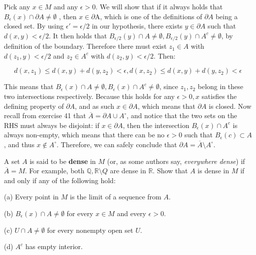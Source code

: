 \begin{solution}

    Pick any $x \in M$ and any $\epsilon > 0$.
    We will show that if it always holds that $B_{\epsilon}(x) \cap \partial A \neq \emptyset$ , then $x \in \partial $A, which is one of the definitions of $\partial A$ being a closed set.
    By using $\epsilon' = \epsilon/2$ in our hypothesis, there exists $y \in \partial A$ such that $d(x, y) < \epsilon/2$.
    It then holds that $B_{\epsilon/2}(y) \cap A \neq \emptyset, B_{\epsilon/2}(y) \cap A^c \neq \emptyset$, by definition of the boundary.
    Therefore there must exist $z_1 \in A$ with $d(z_1, y) < \epsilon/2$ and $z_2 \in A^c$ with $d(z_2, y) < \epsilon/2$.
    Then:

    $$d(x, z_1) \leq d(x, y) + d(y, z_2) < \epsilon, d(x, z_2) \leq d(x, y) + d(y, z_2) < \epsilon$$

    This means that $B_{\epsilon}(x) \cap A \neq \emptyset, B_{\epsilon}(x) \cap A^c \neq \emptyset$, since $z_1, z_2$ belong in these two intersections respectively.
    Because this holds for any $\epsilon > 0, x$ satisfies the defining property of $\partial A$, and as such $x \in \partial A$, which means that $\partial A$ is closed.
    Now recall from exercise 41 that $\overline{A} = \partial A \cup A^\circ$, and notice that the two sets on the RHS must always be disjoint: if $x \in \partial A$, then the intersection $B_{\epsilon}(x) \cap A^c$ is always non-empty, which means that there can be no $\epsilon > 0$ such that $B_{\epsilon}(c) \subset A$, and thus $x \notin A^\circ$.
    Therefore, we can safely conclude that $\partial A = \overline{A} \setminus A^\circ$.
\end{solution}

\begin{exercise}{46}
    A set $A$ is said to be \textbf{dense} in $M$ (or, as some authors say, \textit{everywhere dense}) if $\overline{A} = M$.
    For example, both $\mathbb{Q}, \mathbb{R} \setminus Q$ are dense in $\mathbb{R}$.
    Show that $A$ is dense in $M$ if and only if any of the following hold:

    (a) Every point in $M$ is the limit of a sequence from $A$.

    (b) $B_{\epsilon}(x) \cap A \neq \emptyset$ for every $x \in M$ and every $\epsilon > 0$.

    (c) $U \cap A \neq \emptyset$ for every nonempty open set $U$.

    (d) $A^c$ has empty interior.
\end{exercise}

